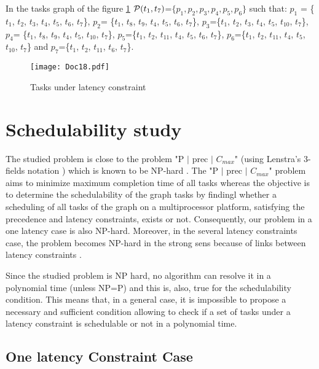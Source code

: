 \documentclass{ijcaArticle}
\begin{document}
In the tasks graph of the figure \ref{cons-clust}  ${\cal P}(t_1,t_7)$=$\{p_1, p_2, p_3, p_4, p_5, p_6\}$ such that: $ p_1$ = \{$t_1$, $t_2$, $t_3$, $t_4$, $t_5$, $t_6$, $t_7$\},  $p_2$= \{$t_1$, $t_8$, $t_9$, $t_4$, $t_5$, $t_6$, $t_7$\},  $p_3$=\{$t_1$, $t_2$, $t_3$, $t_4$, $t_5$, $t_{10}$, $t_7$\}, 
$p_4$= \{$t_1$, $t_8$, $t_9$, $t_4$, $t_5$, $t_{10}$, $t_7$\}, $p_5$=\{$t_1$, $t_2$, $t_{11}$, $t_4$, $t_5$, $t_6$, $t_7$\}, $p_6$=\{$t_1$, $t_2$, $t_{11}$, $t_4$, $t_5$, $t_{10}$, $t_7$\} and $p_7$=\{$t_1$, $t_2$, $t_{11}$, $t_6$, $t_7$\}.

\begin{figure}[h!] 
\begin{center} 
\texttt{[image: Doc18.pdf]} 
\caption{ Tasks under latency constraint} 
\label{cons-clust} \end{center} 
\end{figure}



\section{Schedulability study}
The studied problem is close to the problem "P $|$ prec $|$ $C_{max}$" (using Lenstra's 3-fields notation \cite{grah79}) which is known to be
NP-hard \cite{grah79}. The "P $|$ prec $|$ $C_{max}$" problem aims to minimize maximum completion time of all tasks whereas the objective is to determine the schedulability of the graph tasks by findingl whether a scheduling of all tasks of the graph on a multiprocessor platform, satisfying the precedence and latency constraints, exists or not. Consequently, our problem in a one latency case is also NP-hard. Moreover, in the several latency constraints case, the problem becomes NP-hard in the strong sens because of links between latency constraints .   

Since the studied problem is NP hard, no algorithm can resolve it in a polynomial time (unless NP=P) and this is, also, true for the schedulability condition. This means that, in a
general case, it is impossible to propose a necessary and sufficient condition allowing to check if a set of tasks under a latency constraint is schedulable or not in a polynomial time.




\subsection{One latency Constraint Case}
\end{document}
